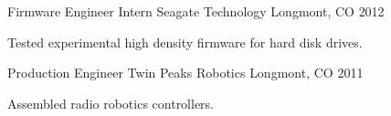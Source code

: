 \begin{cventries}
  \cventry
    {Firmware Engineer Intern} %
    {Seagate Technology} %
    {Longmont, CO} %
    {2012} %
    {
      \begin{cvitems} %
        \item {Tested experimental high density firmware for hard disk drives.}
      \end{cvitems}
    }

  \cventry
    {Production Engineer} %
    {Twin Peaks Robotics} %
    {Longmont, CO} %
    {2011} %
    {
      \begin{cvitems} %
        \item {Assembled radio robotics controllers.}
      \end{cvitems}
    }
   
\end{cventries}
